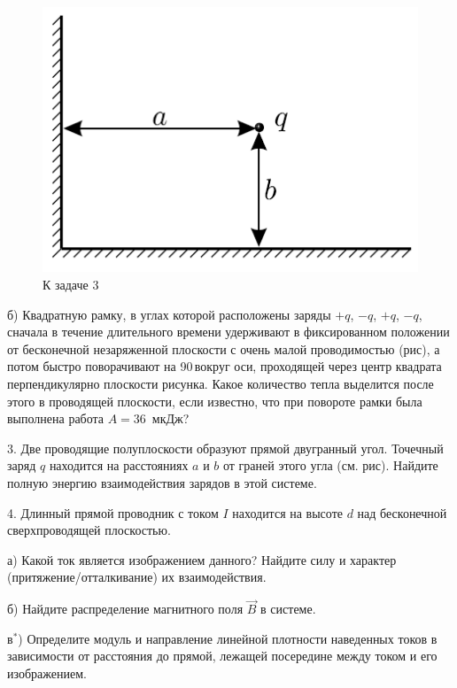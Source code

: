 \documentclass[14pt]{article}
\begin{document}
\begin{figure}
\begin{center}
\vspace{-5mm}
\includegraphics[scale=0.4]{images2.png}
\vspace{-6mm}
\caption{\hspace{-2.5mm}К задаче 3}
\end{center}
\vspace{-6mm}
\end{figure}

б) Квадратную рамку, в углах которой расположены заряды $+q$, $-q$, $+q$, $-q$, сначала в течение длительного времени удерживают в фиксированном положении от бесконечной незаряженной плоскости с очень малой проводимостью (рис), а потом быстро поворачивают на 90\textdegree \,вокруг оси, проходящей через центр квадрата перпендикулярно плоскости рисунка. Какое количество тепла выделится после этого в проводящей плоскости, если известно, что при повороте рамки была выполнена работа $A=36$~мкДж?

3. Две проводящие полуплоскости образуют прямой двугранный угол. Точечный заряд $q$ находится на расстояниях $a$ и $b$ от граней этого угла (см. рис). Найдите полную энергию взаимодействия зарядов в этой системе.

4. Длинный прямой проводник с током $I$ находится на высоте $d$ над бесконечной сверхпроводящей плоскостью.

а) Какой ток является изображением данного? Найдите силу и характер (притяжение/отталкивание) их взаимодействия.

б) Найдите распределение магнитного поля $\vec{B}$ в системе.

в$^*$) Определите модуль и направление линейной плотности наведенных токов в зависимости от расстояния до прямой, лежащей посередине между током и его изображением.
\end{document}
